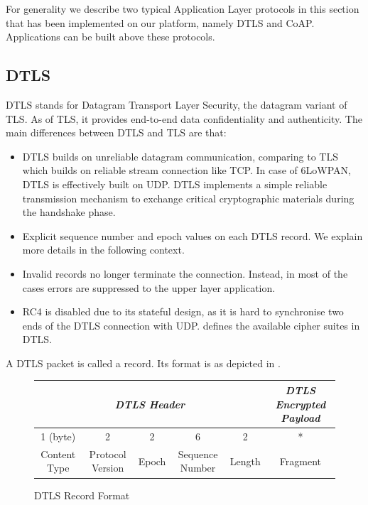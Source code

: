 For generality we describe two typical Application Layer protocols in this section that has been implemented on our platform, namely DTLS\cite{rfc6347} and CoAP\cite{rfc7252}. Applications can be built above these protocols.

\subsection{DTLS} \label{Subsec: DTLS}
DTLS\cite{rfc6347} stands for Datagram Transport Layer Security, the datagram variant of TLS. As of TLS, it provides end-to-end data confidentiality and authenticity. The main differences between DTLS and TLS are that:

\begin{itemize}
	\item DTLS builds on unreliable datagram communication, comparing to TLS which builds on reliable stream connection like TCP. In case of 6LoWPAN, DTLS is effectively built on UDP. DTLS implements a simple reliable transmission mechanism to exchange critical cryptographic materials during the handshake phase.
	\item Explicit sequence number and epoch values on each DTLS record. We explain more details in the following context.
	\item Invalid records no longer terminate the connection. Instead, in most of the cases errors are suppressed to the upper layer application.
	\item RC4 is disabled due to its stateful design,  as it is hard to synchronise two ends of the DTLS connection with UDP. \cite{DtlsCiphers} defines the available cipher suites in DTLS.
\end{itemize}

A DTLS packet is called a record. Its format is as depicted in .

\begin{figure}[h!]
	\center
	\begin{tabular}{cccccc}
		\multicolumn{5}{c}{\textit{DTLS Header}}                                                                                                                                     & \textit{DTLS Encrypted Payload} \\ \hline
		\multicolumn{1}{|c|}{1 (byte)}     & \multicolumn{1}{c|}{2}                & \multicolumn{1}{c|}{2}     & \multicolumn{1}{c|}{6}               & \multicolumn{1}{c|}{2}      & \multicolumn{1}{c|}{*}          \\ \hline
		\multicolumn{1}{|c|}{Content Type} & \multicolumn{1}{c|}{Protocol Version} & \multicolumn{1}{c|}{Epoch} & \multicolumn{1}{c|}{Sequence Number} & \multicolumn{1}{c|}{Length} & \multicolumn{1}{c|}{Fragment}   \\ \hline
	\end{tabular}
	\caption{DTLS Record Format}
	\label{Fig: DTLS Record Format}
\end{figure}

